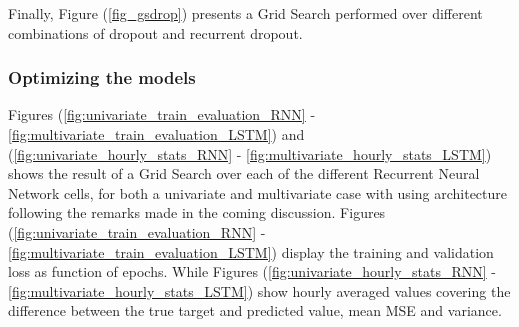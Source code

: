 \documentclass
[twocolumn,
secnumarabic,
nobibnotes,
aps,
prl,
reprint,
groupedaddress,
amsmath,
amssymb,
]{revtex4-2}
\begin{document}
Finally, Figure (\ref{fig_gsdrop}) presents a Grid Search performed over different combinations of dropout and recurrent dropout. 

\subsubsection{Optimizing the models}
Figures (\ref{fig:univariate_train_evaluation_RNN} - \ref{fig:multivariate_train_evaluation_LSTM}) and (\ref{fig:univariate_hourly_stats_RNN} - \ref{fig:multivariate_hourly_stats_LSTM}) shows the result of a Grid Search over each of the different Recurrent Neural Network cells, for both a univariate and multivariate case with using architecture following the remarks made in the coming discussion. Figures (\ref{fig:univariate_train_evaluation_RNN} - \ref{fig:multivariate_train_evaluation_LSTM}) display the training and validation loss as function of epochs. While Figures (\ref{fig:univariate_hourly_stats_RNN} - \ref{fig:multivariate_hourly_stats_LSTM}) show hourly averaged values covering the difference between the true target and predicted value, mean MSE and variance. 
\end{document}
